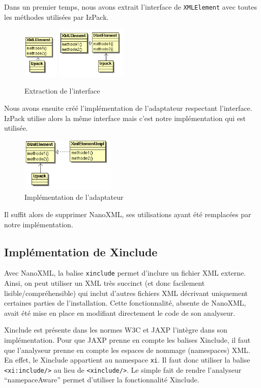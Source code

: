 Dans un premier temps, nous avons extrait l'interface de \verb|XMLElement| avec toutes les méthodes utilisées par IzPack.
\begin{figure}[H]
	\centering
	\includegraphics[width=0.15\textwidth]{../image/sol_casInitial.png}
	\hfil
	\includegraphics[width=0.3\textwidth]{../image/sol_extractionInterface.png}
	\caption{Extraction de l'interface}
\end{figure}
Nous avons ensuite créé l'implémentation de l'adaptateur respectant l'interface.
IzPack utilise alors la même interface mais c'est notre implémentation qui est utilisée.
\begin{figure}[H]
	\centering
	\includegraphics[width=0.4\textwidth]{../image/sol_implementation.png}
	\caption{Implémentation de l'adaptateur}
\end{figure}
Il suffit alors de supprimer NanoXML, ses utilisations ayant été remplacées par notre implémentation.
\subsection{Implémentation de Xinclude}
Avec NanoXML, la balise \verb|xinclude| permet d'inclure un fichier XML externe.
Ainsi, on peut utiliser un XML très succinct (et donc facilement lisible/compréhensible) qui inclut d'autres fichiers XML décrivant uniquement certaines parties de l'installation.
Cette fonctionnalité, absente de NanoXML, avait été mise en place en modifiant directement le code de son analyseur.

Xinclude est présente dans les normes W3C et JAXP l'intègre dans son implémentation.
Pour que JAXP prenne en compte les balises Xinclude, il faut que l'analyseur prenne en compte les espaces de nommage (namespaces) XML.
En effet, le Xinclude appartient au namespace \verb|xi|.
Il faut donc utiliser la balise \verb|<xi:include/>| au lieu de \verb|<xinclude/>|.
Le simple fait de rendre l'analyseur ``namepaceAware'' permet d'utiliser la fonctionnalité Xinclude.
